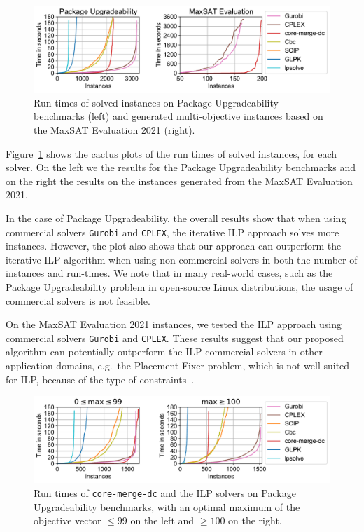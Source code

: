 \documentclass[a4paper,UKenglish,cleveref, autoref, thm-restate]{lipics-v2021}
\begin{document}
\begin{figure}[t]
  \centering
  \includegraphics[width=1\linewidth]{images/pack_mse21_join.pdf}
  \caption{Run times of solved instances on Package Upgradeability benchmarks (left) and generated multi-objective instances based on the MaxSAT Evaluation 2021 (right).}
  \label{fig:run-times-global}
\end{figure}

Figure~\ref{fig:run-times-global} shows the cactus plots of the run times of solved instances, for each solver.
On the left we the results for the Package Upgradeability benchmarks and on the right the results on the instances generated from the MaxSAT Evaluation 2021.

In the case of Package Upgradeability, the overall results show that when using commercial solvers \texttt{Gurobi} and \texttt{CPLEX}, the iterative ILP approach solves more instances. However, the plot also shows that our approach can outperform the iterative ILP algorithm when using non-commercial solvers in both the number of instances and run-times. We note that in many real-world cases, such as the Package Upgradeability problem in open-source Linux distributions, the usage of commercial solvers is not feasible.

On the MaxSAT Evaluation 2021 instances, we tested the ILP approach using commercial solvers \texttt{Gurobi} and \texttt{CPLEX}.
These results suggest that our proposed algorithm can potentially outperform the ILP commercial solvers in other application domains, e.g.\ the Placement Fixer problem, which is not well-suited for ILP, because of the type of constraints~\cite{DBLP:conf/tacas/NadelR16}.

\begin{figure}[t]
  \centering
  \includegraphics[width=1\linewidth]{images/package_upgradeability/by_opt_val.pdf}
  \caption{Run times of \texttt{core-merge-dc} and the ILP solvers on Package Upgradeability benchmarks, with an optimal maximum of the objective vector $\leq 99$ on the left and $\geq 100$ on the right.}
  \label{fig:run-times-by-opt-val}
 \end{figure}
\end{document}
